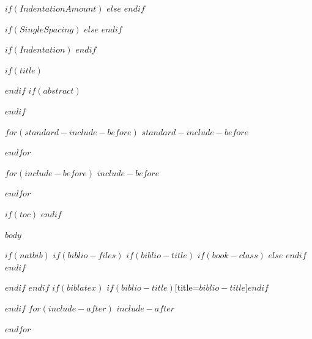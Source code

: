 \newlength{\maxheaderboth}
\setlength{\maxheaderboth}{\maxheader}
\ifthenelse{\lengthtest{\maxheaderfirst>\maxheader}}{\setlength{\maxheaderboth}{\maxheaderfirst}}{}

\newlength{\backup}
\setlength\backup{0pt}

\makeatletter
{}
\makeatother
{}

\pagestyle{basicstyle}


\renewcommand*\familydefault{\sfdefault}
\normalfont
\ifthenelse{\lengthtest{\backup<0pt}}{\addtolength{\backup}{-2\baselineskip}\vspace*{\backup}\par}{}

\newlength{\myindentamount}
$if(IndentationAmount)$
\setlength{\myindentamount}{$IndentationAmount$}
$else$
\setlength{\myindentamount}{0.5in}
$endif$

$if(SingleSpacing)$
\setlength{\parskip}{\myfontsize}
$else$
\doublespacing
\setlength{\parindent}{\myindentamount}
\setlength{\RaggedRightParindent}{\parindent}
$endif$

$if(Indentation)$
\setlength{\parindent}{\myindentamount}
\setlength{\RaggedRightParindent}{\parindent}
$endif$

$if(title)$
\maketitle
$endif$
$if(abstract)$
\begin{abstract}
$abstract$
\end{abstract}
$endif$

$for(standard-include-before)$
$standard-include-before$

$endfor$

$for(include-before)$
$include-before$

$endfor$

$if(toc)$
{
\hypersetup{linkcolor=black}
\setcounter{tocdepth}{$toc-depth$}
\tableofcontents
}
$endif$
\thispagestyle{firststyle}

$body$

$if(natbib)$
$if(biblio-files)$
$if(biblio-title)$
$if(book-class)$
\renewcommand\bibname{$biblio-title$}
$else$
\renewcommand\refname{$biblio-title$}
$endif$
$endif$


$endif$
$endif$
$if(biblatex)$
\printbibliography$if(biblio-title)$[title=$biblio-title$]$endif$

$endif$
$for(include-after)$
$include-after$

$endfor$


